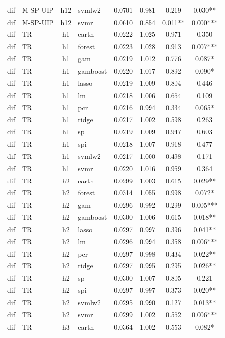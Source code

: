 \begin{ThreePartTable}
\begin{longtable}[t]{llclcccc}
dif & M-SP-UIP & h12 & svmlw2 & 0.0701 & 0.981 & 0.219 & 0.030**\\
dif & M-SP-UIP & h12 & svmr & 0.0610 & 0.854 & 0.011** & 0.000***\\
\addlinespace
dif & TR & h1 & earth & 0.0222 & 1.025 & 0.971 & 0.350\\
dif & TR & h1 & forest & 0.0223 & 1.028 & 0.913 & 0.007***\\
dif & TR & h1 & gam & 0.0219 & 1.012 & 0.776 & 0.087*\\
dif & TR & h1 & gamboost & 0.0220 & 1.017 & 0.892 & 0.090*\\
dif & TR & h1 & lasso & 0.0219 & 1.009 & 0.804 & 0.446\\
dif & TR & h1 & lm & 0.0218 & 1.006 & 0.664 & 0.109\\
dif & TR & h1 & pcr & 0.0216 & 0.994 & 0.334 & 0.065*\\
dif & TR & h1 & ridge & 0.0217 & 1.002 & 0.598 & 0.263\\
dif & TR & h1 & sp & 0.0219 & 1.009 & 0.947 & 0.603\\
dif & TR & h1 & spi & 0.0218 & 1.007 & 0.918 & 0.477\\
dif & TR & h1 & svmlw2 & 0.0217 & 1.000 & 0.498 & 0.171\\
dif & TR & h1 & svmr & 0.0220 & 1.016 & 0.959 & 0.364\\
\addlinespace
dif & TR & h2 & earth & 0.0299 & 1.003 & 0.615 & 0.029**\\
dif & TR & h2 & forest & 0.0314 & 1.055 & 0.998 & 0.072*\\
dif & TR & h2 & gam & 0.0296 & 0.992 & 0.299 & 0.005***\\
dif & TR & h2 & gamboost & 0.0300 & 1.006 & 0.615 & 0.018**\\
dif & TR & h2 & lasso & 0.0297 & 0.997 & 0.396 & 0.041**\\
dif & TR & h2 & lm & 0.0296 & 0.994 & 0.358 & 0.006***\\
dif & TR & h2 & pcr & 0.0297 & 0.998 & 0.434 & 0.022**\\
dif & TR & h2 & ridge & 0.0297 & 0.995 & 0.295 & 0.026**\\
dif & TR & h2 & sp & 0.0300 & 1.007 & 0.805 & 0.221\\
dif & TR & h2 & spi & 0.0297 & 0.997 & 0.373 & 0.020**\\
dif & TR & h2 & svmlw2 & 0.0295 & 0.990 & 0.127 & 0.013**\\
dif & TR & h2 & svmr & 0.0299 & 1.002 & 0.562 & 0.006***\\
\addlinespace
dif & TR & h3 & earth & 0.0364 & 1.002 & 0.553 & 0.082*\\

\end{longtable}
\end{ThreePartTable}
